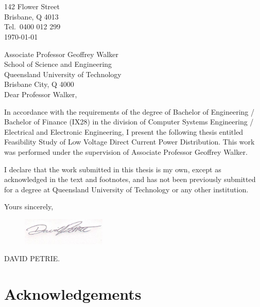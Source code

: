 \newpage


\section*{}

\begin{flushright}
	142 Flower Street\\
	Brisbane, Q 4013\\
	Tel.\ 0400 012 299\\
	\medskip
	\today
\end{flushright}
\begin{flushleft}
  Associate Professor Geoffrey Walker\\
  School of Science and Engineering\\
  Queensland University of Technology\\
  Brisbane City, Q 4000\\
  \bigskip\bigskip
  Dear Professor Walker,
\end{flushleft}

In accordance with the requirements of the degree of Bachelor of
Engineering / Bachelor of Finance (IX28) in the division of Computer Systems
Engineering / Electrical and Electronic Engineering, I present the
following thesis entitled Feasibility Study of Low Voltage Direct Current Power Distribution.  This work was performed under the supervision of Associate Professor Geoffrey Walker.

I declare that the work submitted in this thesis is my own, except as
acknowledged in the text and footnotes, and has not been previously
submitted for a degree at Queensland University of Technology or any other
institution.

\begin{flushright}
	Yours sincerely,\\
	\medskip
	\begin{figure}[H]
	\hfill\includegraphics[width = 40mm]{images/Signature.JPG}%
	\end{figure} 
	\medskip
	DAVID PETRIE.
\end{flushright}

\newpage

\section*{Acknowledgements}


